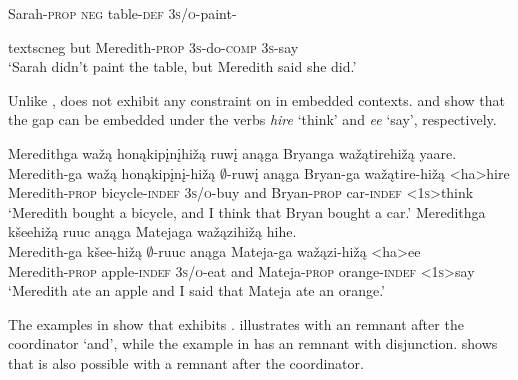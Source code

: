 \documentclass[output=paper]{LSP/langsci}
\begin{document}
Sarah-\textsc{prop} \textsc{neg} table-\textsc{def} \textsc{3s/o}-paint-{textsc{neg} but Meredith-\textsc{prop} \textsc{3s}-do-\textsc{comp} \textsc{3s}-say\\
\trans `Sarah didn't paint the table, but Meredith said she did.'
\z
\z

Unlike ,  does not exhibit any constraint on  in embedded contexts.  and  show that the gap can be embedded under the verbs \emph{hire} `think' and \emph{ee} `say', respectively.

 
\ea
\ea\label{ex:johnson:39a} 
\glll Meredithga {wažą honąkipįnįhižą} ruwį anąga Bryanga wažątirehižą yaare.\\
Meredith-ga {wažą honąkipįnį-hižą} $\emptyset$-ruwį anąga Bryan-ga wažątire-hižą <ha>hire\\
Meredith-\textsc{prop} bicycle-\textsc{indef} \textsc{3s/o}-buy and Bryan-\textsc{prop} car-\textsc{indef} \textsc{<1s>}think\\
\trans `Meredith bought a bicycle, and I think that Bryan bought a car.'
\ex\label{ex:johnson:39b}
\glll Meredithga kšeehižą ruuc anąga Matejaga wažązihižą hihe.\\
Meredith-ga kšee-hižą $\emptyset$-ruuc anąga Mateja-ga wažązi-hižą <ha>ee\\
Meredith-\textsc{prop} apple-\textsc{indef} \textsc{3s/o}-eat and Mateja-\textsc{prop} orange-\textsc{indef} <\textsc{1s}>say\\
\trans `Meredith ate an apple and I said that Mateja ate an orange.'
\z
\z

The examples in  show that  exhibits .  illustrates  with an  remnant after the coordinator `and', while the example in  has an  remnant with disjunction.  shows that  is also possible with a  remnant after the coordinator.

}
\end{document}
